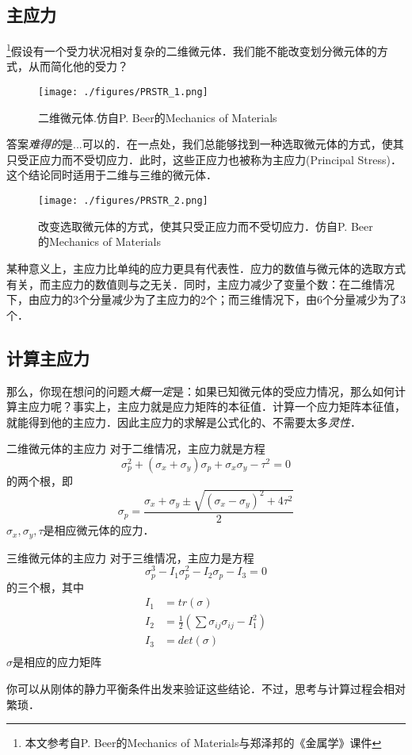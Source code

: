 

\subsection{主应力}
\footnote{本文参考自P. Beer的Mechanics of Materials与郑泽邦的《金属学》课件}假设有一个受力状况相对复杂的二维微元体．我们能不能改变划分微元体的方式，从而简化他的受力？
\begin{figure}[ht]
\centering
\texttt{[image: ./figures/PRSTR\_1.png]}
\caption{二维微元体.仿自P. Beer的Mechanics of Materials} \label{PRSTR_fig1}
\end{figure}

答案\textsl{难得的}是...可以的．在一点处，我们总能够找到一种选取微元体的方式，使其只受正应力而不受切应力．此时，这些正应力也被称为主应力(Principal Stress)．这个结论同时适用于二维与三维的微元体．
\begin{figure}[ht]
\centering
\texttt{[image: ./figures/PRSTR\_2.png]}
\caption{改变选取微元体的方式，使其只受正应力而不受切应力．仿自P. Beer的Mechanics of Materials} \label{PRSTR_fig2}
\end{figure}

某种意义上，主应力比单纯的应力更具有代表性．应力的数值与微元体的选取方式有关，而主应力的数值则与之无关．同时，主应力减少了变量个数：在二维情况下，由应力的3个分量减少为了主应力的2个；而三维情况下，由6个分量减少为了3个．

\subsection{计算主应力}

那么，你现在想问的问题\textsl{大概一定}是：如果已知微元体的受应力情况，那么如何计算主应力呢？事实上，主应力就是应力矩阵的本征值．计算一个应力矩阵本征值，就能得到他的主应力．因此主应力的求解是公式化的、不需要太多\textsl{灵性}．

\begin{example}{二维微元体的主应力}
对于二维情况，主应力就是方程
$$\sigma_p^2+(\sigma_x+\sigma_y)\sigma_p+\sigma_x\sigma_y-\tau^2=0$$
的两个根，即
$$\sigma_p=\frac{\sigma_x+\sigma_y \pm \sqrt{(\sigma_x-\sigma_y)^2+4\tau^2}}{2}$$
$\sigma_x,\sigma_y,\tau$是相应微元体的应力．
\end{example}

\begin{example}{三维微元体的主应力}
对于三维情况，主应力是方程 
$$
\sigma_p^3-I_1\sigma_p^2-I_2\sigma_p-I_3=0
$$
的三个根，其中
$$
\begin{aligned}
I_1&=tr(\sigma)\\
I_2&=\frac{1}{2} ({\sum \sigma_{ij} \sigma_{ij} -I_1^2})\\
I_3&=det(\sigma)\\
\end{aligned}
$$
$\sigma$是相应的应力矩阵
\end{example}
你可以从刚体的静力平衡条件出发来验证这些结论．不过，思考与计算过程会相对繁琐．
